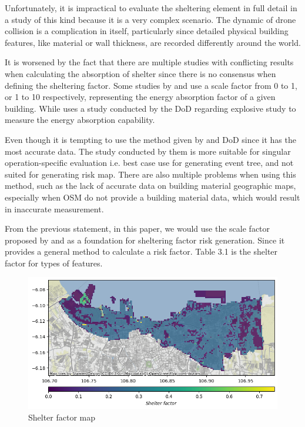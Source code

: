 \documentclass[12pt]{report}
\begin{document}
            Unfortunately, it is impractical to evaluate the sheltering element in full detail in a study of this kind
            because it is a very complex scenario. The dynamic of drone collision is a complication in itself,
            particularly since detailed physical building features, like material or wall thickness, are recorded
            differently around the world.

            It is worsened by the fact that there are multiple studies with conflicting results when calculating the
            absorption of shelter since there is no consensus when defining the sheltering factor. Some studies by \cite{dalamagkidis_evaluating_2008}
            and \cite{primatesta_ground_2020} use a scale factor from 0 to 1, or 1 to 10 respectively, representing the energy absorption factor
            of a given building. While \cite{melnyk_third-party_2014} uses a study conducted by the \ac{DoD} \cite{harwick_approved_2007} regarding
            explosive study to measure the energy absorption capability.

            Even though it is tempting to use the method given by \cite{melnyk_third-party_2014} and DoD since it has the most accurate data. The
            study conducted by them is more suitable for singular operation-specific evaluation i.e. best case use for
            generating event tree, and not suited for generating risk map. There are also multiple problems when using
            this method, such as the lack of accurate data on building material geographic maps, especially when OSM do
            not provide a building material data, which would result in inaccurate measurement.

            From the previous statement, in this paper, we would use the scale factor proposed by \cite{klepeis_national_2001} and \cite{primatesta_ground_2020} as a
            foundation for sheltering factor risk generation. Since it provides a general method to calculate a risk
            factor. Table 3.1 is the shelter factor for types of features.
            
            \begin{figure}[H]
                \centering
                \includegraphics[width=\textwidth]{Plot/shelter_factor.png}
                \caption{Shelter factor map}
            \end{figure}
\end{document}
